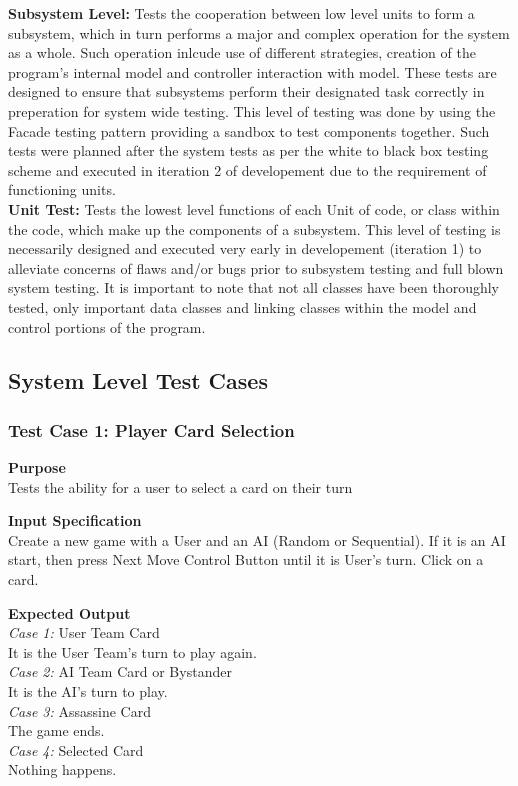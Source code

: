 \documentclass[12pt]{article}
\begin{document}
{\bf Subsystem Level: } Tests the cooperation between low level units to form a subsystem, which in turn performs a major and complex operation for the system as a whole. Such operation inlcude use of different strategies, creation of the program's internal model and controller interaction with model. These tests are designed to ensure that subsystems perform their designated task correctly in preperation for system wide testing. This level of testing was done by using the Facade testing pattern providing a sandbox to test components together. Such tests were planned after the system tests as per the white to black box testing scheme and executed in iteration 2 of developement due to the requirement of functioning units.
\\

{\bf Unit Test: } Tests the lowest level functions of each Unit of code, or class within the code, which make up the components of a subsystem. This level of testing is necessarily designed and executed very early in developement (iteration 1) to alleviate concerns of flaws and/or bugs prior to subsystem testing and full blown system testing. It is important to note that not all classes have been thoroughly tested, only important data classes and linking classes within the model and control portions of the program.
\\


\subsection{System Level Test Cases}

\subsubsection{Test Case 1: Player Card Selection} \label{tc:1}

\noindent
{\bf Purpose}\\
Tests the ability for a user to select a card on their turn

\noindent
{\bf Input Specification}\\
Create a new game with a User and an AI (Random or Sequential). If it is an AI start, then press Next Move Control Button until it is User's turn. Click on a card.

\noindent
{\bf Expected Output}\\
\emph{Case 1:} User Team Card\\
It is the User Team's turn to play again.\\
\emph{Case 2:} AI Team Card or Bystander\\
It is the AI's turn to play.\\
\emph{Case 3:} Assassine Card\\
The game ends.\\
\emph{Case 4:} Selected Card \\
Nothing happens.
\end{document}
